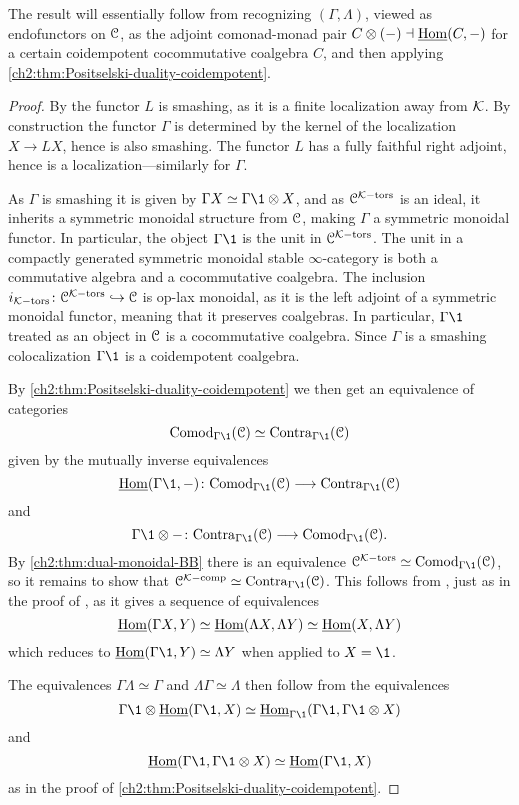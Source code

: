 \begin{remark}
    The result will essentially follow from recognizing $(\Gamma, \Lambda)$, viewed as endofunctors on $\EuScript{C}$, as the adjoint comonad-monad pair $C\otimes (-)\dashv \operatorname{\underline{Hom}}(C,-)$ for a certain coidempotent cocommutative coalgebra $C$, and then applying \cref{ch2:thm:Positselski-duality-coidempotent}. 
\end{remark}

\begin{proof}
    By \cite[3.3.3]{hovey-palmiery-strickland_97} the functor $L$ is smashing, as it is a finite localization away from $\mathcal{K}$. By construction the functor $\Gamma$ is determined by the kernel of the localization $X\to LX$, hence is also smashing. The functor $L$ has a fully faithful right adjoint, hence is a localization---similarly for $\Gamma$. 

    As $\Gamma$ is smashing it is given by $\Gamma X \simeq \Gamma \1 \otimes X$, and as $\EuScript{C}^{\mathcal{K}-\mathrm{tors}}$ is an ideal, it inherits a symmetric monoidal structure from $\EuScript{C}$, making $\Gamma$ a symmetric monoidal functor. In particular, the object $\Gamma \1$ is the unit in $\EuScript{C}^{\mathcal{K}-\mathrm{tors}}$. The unit in a compactly generated symmetric monoidal stable $\infty$-category is both a commutative algebra and a cocommutative coalgebra. The inclusion $i_{\mathcal{K}-\mathrm{tors}}\colon \EuScript{C}^{\mathcal{K}-\mathrm{tors}}\hookrightarrow \EuScript{C}$ is op-lax monoidal, as it is the left adjoint of a symmetric monoidal functor, meaning that it preserves coalgebras. In particular, $\Gamma\1$ treated as an object in $\EuScript{C}$ is a cocommutative coalgebra. Since $\Gamma$ is a smashing colocalization $\Gamma \1$ is a coidempotent coalgebra. 

    By \cref{ch2:thm:Positselski-duality-coidempotent} we then get an equivalence of categories 
    \[\Comod_{\Gamma \1}(\C) \simeq \Contra_{\Gamma \1}(\C)\]
    given by the mutually inverse equivalences 
    \[\iHom(\Gamma \1,-)\: \Comod_{\Gamma\1}(\C) \to \Contra_{\Gamma \1}(\C)\] 
    and 
    \[\Gamma \1\otimes -\: \Contra_{\Gamma\1}(\C) \to \Comod_{\Gamma \1}(\C).\]
    By \cref{ch2:thm:dual-monoidal-BB} there is an equivalence $\C\Ktors\simeq \Comod_{\Gamma\1}(\C)$, so it remains to show that $\C\Kcomp\simeq \Contra_{\Gamma \1}(\C)$. This follows from \cite[2.2]{barthel-heard-valenzuela_2018}, just as in the proof of \cite[2.21(4)]{barthel-heard-valenzuela_2018}, as it gives a sequence of equivalences 
    \[\operatorname{\underline{Hom}}(\Gamma X, Y) \simeq \operatorname{\underline{Hom}}(\Lambda X, \Lambda Y)\simeq \operatorname{\underline{Hom}}(X, \Lambda Y)\]
    which reduces to $\iHom(\Gamma \1, Y) \simeq \Lambda Y$ when applied to $X=\1$. 

    The equivalences $\Gamma \Lambda \simeq \Gamma$ and $\Lambda\Gamma \simeq \Lambda$ then follow from the equivalences 
    \[\Gamma \1 \otimes \iHom(\Gamma\1, X)\simeq \iHom_{\Gamma\1}(\Gamma\1, \Gamma\1\otimes X)\]  
    and 
    \[\iHom(\Gamma\1, \Gamma\1\otimes X)\simeq \iHom(\Gamma \1, X)\] 
    as in the proof of \cref{ch2:thm:Positselski-duality-coidempotent}. 
\end{proof}

